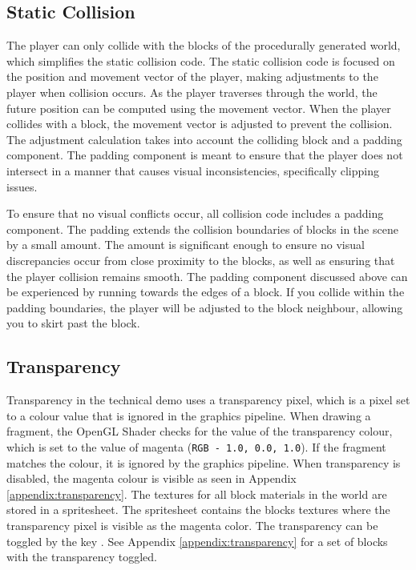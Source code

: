 \documentclass[a4paper,11pt,titlepage]{scrartcl}
\begin{document}
\subsection{Static Collision}
\label{section:collision}
The player can only collide with the blocks of the procedurally generated world, which simplifies the static collision code. The static collision code is focused on the position and movement vector of the player, making adjustments to the player when collision occurs. As the player traverses through the world, the future position can be computed using the movement vector. When the player collides with a block, the movement vector is adjusted to prevent the collision. The adjustment calculation takes into account the colliding block and a padding component. The padding component is meant to ensure that the player does not intersect in a manner that causes visual inconsistencies, specifically clipping issues.

To ensure that no visual conflicts occur, all collision code includes a padding component. The padding extends the collision boundaries of blocks in the scene by a small amount. The amount is significant enough to ensure no visual discrepancies occur from close proximity to the blocks, as well as ensuring that the player collision remains smooth. The padding component discussed above can be experienced by running towards the edges of a block. If you collide within the padding boundaries, the player will be adjusted to the block neighbour, allowing you to skirt past the block.
   
\subsection{Transparency}
\label{section:transparency}
Transparency in the technical demo uses a transparency pixel, which is a pixel set to a colour value that is ignored in the graphics pipeline.  When drawing a fragment, the OpenGL Shader checks for the value of the transparency colour, which is set to the value of magenta (\texttt{RGB - 1.0, 0.0, 1.0}).  If the fragment matches the colour, it is ignored by the graphics pipeline.  When transparency is disabled, the magenta colour is visible as seen in Appendix \ref{appendix:transparency}.  The textures for all block materials in the world are stored in a spritesheet.  The spritesheet contains the blocks textures where the transparency pixel is visible as the magenta color.
\vskip 2.5mm\noindent
The transparency can be toggled by the key .  See Appendix \ref{appendix:transparency} for a set of blocks with the transparency toggled.
    
\end{document}
